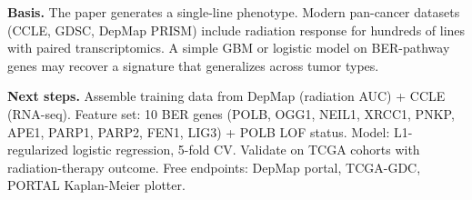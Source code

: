 \textbf{Basis.} The paper generates a single-line phenotype. Modern pan-cancer datasets (CCLE, GDSC, DepMap PRISM) include radiation response for hundreds of lines with paired transcriptomics. A simple GBM or logistic model on BER-pathway genes may recover a signature that generalizes across tumor types.

\textbf{Next steps.} Assemble training data from DepMap (radiation AUC) + CCLE (RNA-seq). Feature set: 10 BER genes (POLB, OGG1, NEIL1, XRCC1, PNKP, APE1, PARP1, PARP2, FEN1, LIG3) + POLB LOF status. Model: L1-regularized logistic regression, 5-fold CV. Validate on TCGA cohorts with radiation-therapy outcome. Free endpoints: DepMap portal, TCGA-GDC, PORTAL Kaplan-Meier plotter.
